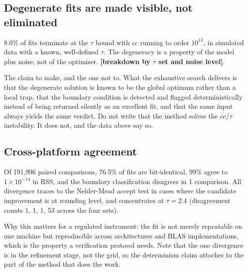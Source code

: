 \documentclass[11pt,a4paper]{article}
\newcommand{\FILL}[1]{\textbf{\textcolor{coneC}{[#1]}}}
\begin{document}
\subsection{Degenerate fits are made visible, not eliminated}
\begin{evidence}
8.0\% of fits terminate at the $\tau$ bound with $cc$ running to order
$10^{13}$, in simulated data with a known, well-defined $\tau$. The
degeneracy is a property of the model plus noise, not of the optimiser.
\FILL{breakdown by $\tau$ set and noise level}.
\end{evidence}
\begin{towrite}
The claim to make, and the one not to. What the exhaustive search delivers
is that the degenerate solution is known to be the global optimum rather
than a local trap, that the boundary condition is detected and flagged
deterministically instead of being returned silently as an excellent fit,
and that the same input always yields the same verdict. Do not write that
the method solves the $cc$/$\tau$ instability. It does not, and the data
above say so.
\end{towrite}

\subsection{Cross-platform agreement}
\begin{evidence}
Of 191,996 paired comparisons, 76.5\% of fits are bit-identical, 99\% agree
to $1\times10^{-14}$ in RSS, and the boundary classification disagrees in 1
comparison. All divergence traces to the Nelder-Mead accept test in cases
where the candidate improvement is at rounding level, and concentrates at
$\tau = 2.4$ (disagreement counts 1, 1, 1, 53 across the four sets).
\end{evidence}
\begin{towrite}
Why this matters for a regulated instrument: the fit is not merely
repeatable on one machine but reproducible across architectures and BLAS
implementations, which is the property a verification protocol needs. Note
that the one divergence is in the refinement stage, not the grid, so the
determinism claim attaches to the part of the method that does the work.
\end{towrite}
\end{document}

